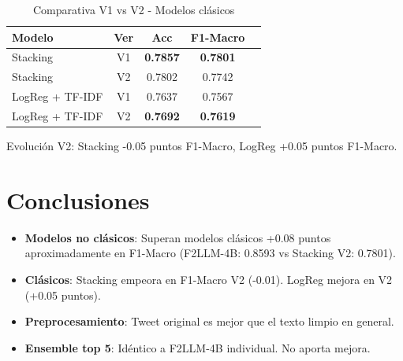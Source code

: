 \documentclass[11pt,a4paper]{article}
\begin{document}
\begin{table}[h]
    \centering
    \small
    \begin{tabular}{@{}lcccc@{}}
        \toprule
        \textbf{Modelo} & \textbf{Ver} & \textbf{Acc}    & \textbf{F1-Macro} \\
        \midrule
        Stacking        & V1           & \textbf{0.7857} & \textbf{0.7801}   \\
        Stacking        & V2           & 0.7802          & 0.7742            \\
        \midrule
        LogReg + TF-IDF & V1           & 0.7637          & 0.7567            \\
        LogReg + TF-IDF & V2           & \textbf{0.7692} & \textbf{0.7619}   \\
        \bottomrule
    \end{tabular}
    \caption{Comparativa V1 vs V2 - Modelos clásicos}
    \label{tab:v1_v2_classic}
\end{table}

Evolución V2: Stacking -0.05 puntos F1-Macro, LogReg +0.05 puntos F1-Macro.

\section{Conclusiones}

\begin{itemize}
    \item \textbf{Modelos no clásicos}: Superan modelos clásicos +0.08 puntos aproximadamente en F1-Macro (F2LLM-4B: 0.8593 vs Stacking V2: 0.7801).
    \item \textbf{Clásicos}: Stacking empeora en F1-Macro V2 (-0.01). LogReg mejora en V2 (+0.05 puntos).
    \item \textbf{Preprocesamiento}: Tweet original es mejor que el texto limpio en general.
    \item \textbf{Ensemble top 5}: Idéntico a F2LLM-4B individual. No aporta mejora.
\end{itemize}
\end{document}
